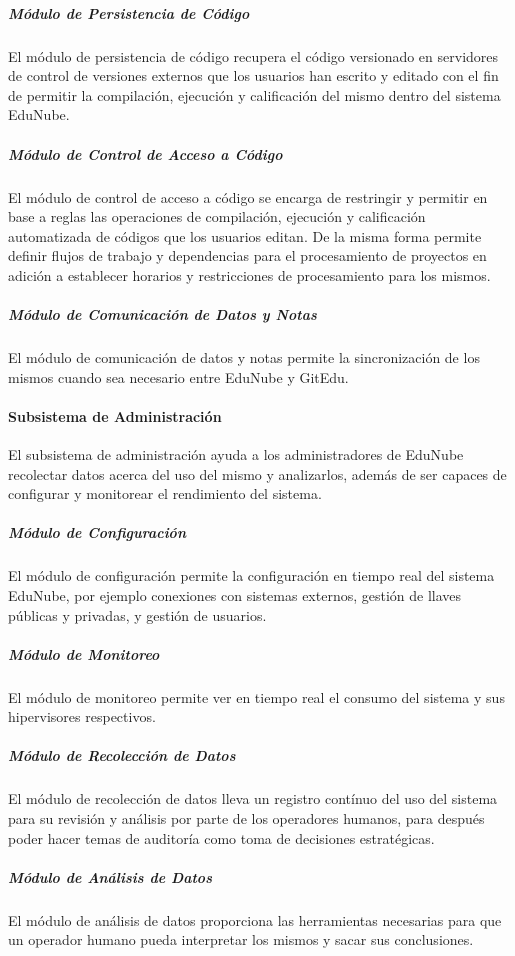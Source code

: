 \subparagraph{Módulo de Persistencia de Código}
El módulo de persistencia de código recupera el código versionado en servidores de control de versiones externos que los usuarios han escrito y editado con el fin de permitir la compilación, ejecución y calificación del mismo dentro del sistema EduNube.

\subparagraph{Módulo de Control de Acceso a Código}
El módulo de control de acceso a código se encarga de restringir y permitir en base a reglas las operaciones de compilación, ejecución y calificación automatizada de códigos que los usuarios editan. De la misma forma permite definir flujos de trabajo y dependencias para el procesamiento de proyectos en adición a establecer horarios y restricciones de procesamiento para los mismos.

\subparagraph{Módulo de Comunicación de Datos y Notas}
El módulo de comunicación de datos y notas permite la sincronización de los mismos cuando sea necesario entre EduNube y GitEdu.

\paragraph{Subsistema de Administración}
El subsistema de administración ayuda a los administradores de EduNube recolectar datos acerca del uso del mismo y analizarlos, además de ser capaces de configurar y monitorear el rendimiento del sistema.

\subparagraph{Módulo de Configuración}
El módulo de configuración permite la configuración en tiempo real del sistema EduNube, por ejemplo conexiones con sistemas externos, gestión de llaves públicas y privadas, y gestión de usuarios.

\subparagraph{Módulo de Monitoreo}
El módulo de monitoreo permite ver en tiempo real el consumo del sistema y sus hipervisores respectivos.

\subparagraph{Módulo de Recolección de Datos}
El módulo de recolección de datos lleva un registro contínuo del uso del sistema para su revisión y análisis por parte de los operadores humanos, para después poder hacer temas de auditoría como toma de decisiones estratégicas.

\subparagraph{Módulo de Análisis de Datos}
El módulo de análisis de datos proporciona las herramientas necesarias para que un operador humano pueda interpretar los mismos y sacar sus conclusiones.

